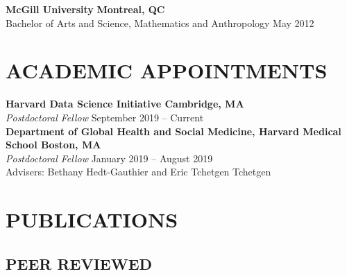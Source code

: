 \documentclass[12pt]{article}
\begin{document}
\textbf{McGill University} \hfill \hfill \textbf{Montreal, QC} \\
Bachelor of Arts and Science, Mathematics and Anthropology  \hfill \hfill May 2012 


\section*{\textbf{{\large A}CADEMIC {\large A}PPOINTMENTS }}

\textbf{Harvard Data Science Initiative \hfill \hfill Cambridge, MA} \\
\textit{Postdoctoral Fellow}  \hfill \hfill September 2019 -- Current \\

\textbf{Department of Global Health and Social Medicine, Harvard Medical School \hfill \hfill Boston, MA} \\
\textit{Postdoctoral Fellow} \hfill \hfill January 2019 -- August 2019 \\
Advisers: Bethany Hedt-Gauthier and Eric Tchetgen Tchetgen 

\section*{\textbf{{\large P}{UBLICATIONS}}}

\subsection*{\textbf{PEER REVIEWED}}
\end{document}
